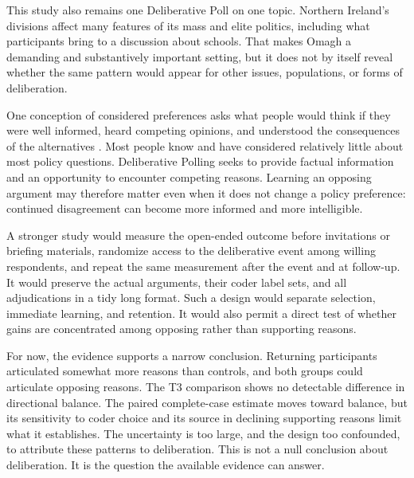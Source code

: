 \documentclass{article}
\begin{document}
This study also remains one Deliberative Poll on one topic. Northern Ireland's divisions affect
many features of its mass and elite politics, including what participants bring to a discussion
about schools. That makes Omagh a demanding and substantively important setting, but it does
not by itself reveal whether the same pattern would appear for other issues, populations, or
forms of deliberation.

One conception of considered preferences asks what people would think if they were well
informed, heard competing opinions, and understood the consequences of the alternatives
\citep{fishkin1991democracy,fishkin2009people,dahl1989democracy,arendt1968truth}. Most
people know and have considered relatively little about most policy questions. Deliberative
Polling seeks to provide factual information and an opportunity to encounter competing
reasons. Learning an opposing argument may therefore matter even when it does not change a
policy preference: continued disagreement can become more informed and more intelligible.

A stronger study would measure the open-ended outcome before invitations or briefing
materials, randomize access to the deliberative event among willing respondents, and repeat the
same measurement after the event and at follow-up. It would preserve the actual arguments,
their coder label sets, and all adjudications in a tidy long format. Such a design would
separate selection, immediate learning, and retention. It would also permit a direct test of
whether gains are concentrated among opposing rather than supporting reasons.

For now, the evidence supports a narrow conclusion. Returning participants articulated
somewhat more reasons than controls, and both groups could articulate
opposing reasons. The T3 comparison shows no detectable difference in directional balance.
The paired complete-case estimate moves toward balance, but its sensitivity to coder choice and
its source in declining supporting reasons limit what it establishes. The uncertainty is too
large, and the design too confounded, to attribute these patterns to deliberation. This is not a
null conclusion about deliberation. It is the question the available evidence can answer.




\singlespacing
\normalsize
\setlength{\parindent}{0pt}
\setlength{\parskip}{6pt}
\appendix
\setcounter{section}{1}
\renewcommand{\thesection}{S}
\setcounter{table}{0}
\renewcommand{\thetable}{S\arabic{table}}
\label{sec:supplement}
\end{document}
